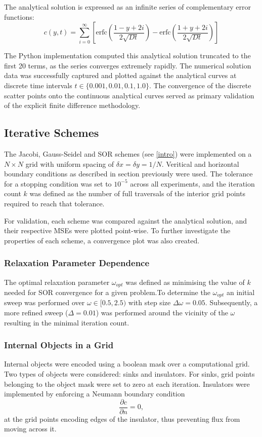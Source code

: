 \documentclass[10pt, journal]{IEEEtran}
\begin{document}
The analytical solution is expressed as an infinite series of complementary error functions:
\begin{equation}
    c(y,t) = \sum_{i=0}^{\infty} \left[ \text{erfc}\left(\frac{1-y+2i}{2\sqrt{Dt}}\right) - \text{erfc}\left(\frac{1+y+2i}{2\sqrt{Dt}}\right) \right]
    \label{eq:analytical}
\end{equation}

The Python implementation computed this analytical solution truncated to the first 20 terms, as the series converges extremely rapidly. The numerical solution data was successfully captured and plotted against the analytical curves at discrete time intervals $t \in \{0.001, 0.01, 0.1, 1.0\}$. The convergence of the discrete scatter points onto the continuous analytical curves served as primary validation of the explicit finite difference methodology.



\subsection{Iterative Schemes}
The Jacobi, Gauss-Seidel and SOR schemes (see \ref{intro}) were implemented on a $N \times N$ grid with uniform spacing of $\delta x = \delta y = 1/N$.  Veritical and horizontal boundary conditions as described in section previously were used. The tolerance for a stopping condition  was set to $10^{-5}$ across all experiments, and the iteration count $k$ was defined as the number of full traversals of the interior grid points required to reach that tolerance. 

For validation, each scheme was compared against the analytical solution, and their respective MSEs were plotted point-wise. To further investigate the properties of each scheme, a convergence plot was also created. 

\subsubsection{Relaxation Parameter Dependence}
The optimal relaxation parameter $\omega_{opt}$ was defined as minimising the value of $k$ needed for SOR convergence for a given problem.To determine the $\omega_{opt}$ an initial sweep was performed over $\omega \in [0.5, 2.5)$ with step size $\Delta \omega =0.05$. Subsequently, a more refined sweep ($\Delta=0.01$) was performed around the vicinity of the $\omega$ resulting in the minimal iteration count. 


\subsubsection{Internal Objects in a Grid}
Internal objects were encoded using a boolean mask over a computational grid. Two types of objects were considered: sinks and insulators. For sinks, grid points belonging to the object mask were set to zero at each iteration. Insulators were implemented by enforcing a Neumann boundary condition \[
\frac{\partial c}{\partial n} = 0,
\]  at the grid points encoding edges of the insulator, thus preventing flux from moving across it. 
\end{document}
